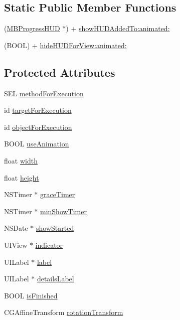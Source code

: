 \subsection*{Static Public Member Functions}
\begin{DoxyCompactItemize}
\item 
(\hyperlink{interface_m_b_progress_h_u_d}{MBProgressHUD} $\ast$) + \hyperlink{interface_m_b_progress_h_u_d_a2f54863d49e67015d6164e5fc2ca36ba}{showHUDAddedTo:animated:}
\item 
(BOOL) + \hyperlink{interface_m_b_progress_h_u_d_ad688ad504d1a601c26ce4f9889276f40}{hideHUDForView:animated:}
\end{DoxyCompactItemize}
\subsection*{Protected Attributes}
\begin{DoxyCompactItemize}
\item 
SEL \hyperlink{interface_m_b_progress_h_u_d_ae28780a2d6fe7834cc029fbbdf206b62}{methodForExecution}
\item 
id \hyperlink{interface_m_b_progress_h_u_d_ac38a276e24f577d9c261e271f57a33c4}{targetForExecution}
\item 
id \hyperlink{interface_m_b_progress_h_u_d_a8a5775046c2febf1bffd946f6febce85}{objectForExecution}
\item 
BOOL \hyperlink{interface_m_b_progress_h_u_d_a46218ca7550d93cf0d9f10b864889f43}{useAnimation}
\item 
float \hyperlink{interface_m_b_progress_h_u_d_ae426f00e82704fa09578f5446e22d915}{width}
\item 
float \hyperlink{interface_m_b_progress_h_u_d_a48083b65ac9a863566dc3e3fff09a5b4}{height}
\item 
NSTimer $\ast$ \hyperlink{interface_m_b_progress_h_u_d_ab4b1d4d09e833eabdb13dc83f73da1d8}{graceTimer}
\item 
NSTimer $\ast$ \hyperlink{interface_m_b_progress_h_u_d_a697ca7d4c1e40af232c289e8ab9b1ff6}{minShowTimer}
\item 
NSDate $\ast$ \hyperlink{interface_m_b_progress_h_u_d_aec6a7dafb64489e886976bac1d834c49}{showStarted}
\item 
UIView $\ast$ \hyperlink{interface_m_b_progress_h_u_d_abd7020204dc7ede51b3e46958c313422}{indicator}
\item 
UILabel $\ast$ \hyperlink{interface_m_b_progress_h_u_d_a077d2090d973b1d47c6e3d6e0c47e8af}{label}
\item 
UILabel $\ast$ \hyperlink{interface_m_b_progress_h_u_d_a077099bddd69564b35222123f4c42f33}{detailsLabel}
\item 
BOOL \hyperlink{interface_m_b_progress_h_u_d_a2f9955018d8c22980f27a7f93876e39a}{isFinished}
\item 
CGAffineTransform \hyperlink{interface_m_b_progress_h_u_d_adc611101946978c2d856725aee5f3268}{rotationTransform}
\end{DoxyCompactItemize}
